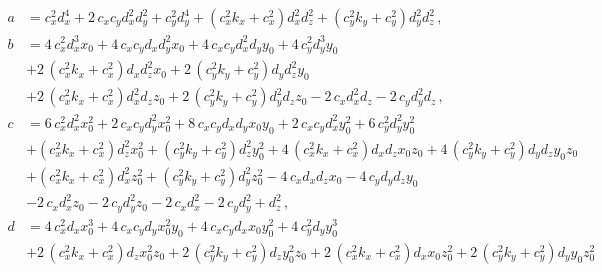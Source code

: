 \documentclass[12pt,a4paper,twoside,openright,BCOR10mm,headsepline,titlepage,abstracton,chapterprefix,final]{scrreprt}
\begin{document}
\begin{subequations}
 \begin{align}
  a &= c_{x}^{2} d_{x}^{4} + 2 \, c_{x} c_{y} d_{x}^{2} d_{y}^{2} + c_{y}^{2} d_{y}^{4} 
	+ {\left(c_{x}^{2} k_{x} + c_{x}^{2}\right)} d_{x}^{2} d_{z}^{2} + {\left(c_{y}^{2} k_{y} + c_{y}^{2}\right)} d_{y}^{2} d_{z}^{2}\,,\\
  b &= 4 \, c_{x}^{2} d_{x}^{3} x_{0} + 4 \, c_{x} c_{y} d_{x} d_{y}^{2} x_{0} 
	+ 4 \, c_{x} c_{y} d_{x}^{2} d_{y} y_{0} + 4 \, c_{y}^{2} d_{y}^{3} y_{0} \nonumber\\&
	+ 2 \, {\left(c_{x}^{2} k_{x} + c_{x}^{2}\right)} d_{x} d_{z}^{2} x_{0} 
	+ 2 \, {\left(c_{y}^{2} k_{y} + c_{y}^{2}\right)} d_{y} d_{z}^{2} y_{0} \nonumber\\& 
	+ 2 \, {\left(c_{x}^{2} k_{x} + c_{x}^{2}\right)} d_{x}^{2} d_{z} z_{0} 
	+ 2 \, {\left(c_{y}^{2} k_{y} + c_{y}^{2}\right)} d_{y}^{2} d_{z} z_{0} 
	- 2 \, c_{x} d_{x}^{2} d_{z} - 2 \, c_{y} d_{y}^{2} d_{z}\,,\\
  c &= 6 \, c_{x}^{2} d_{x}^{2} x_{0}^{2} + 2 \, c_{x} c_{y} d_{y}^{2} x_{0}^{2} + 8 \, c_{x} c_{y} d_{x} d_{y} x_{0} y_{0} 
      + 2 \, c_{x} c_{y} d_{x}^{2} y_{0}^{2} + 6 \, c_{y}^{2} d_{y}^{2} y_{0}^{2} \nonumber\\&
      + {\left(c_{x}^{2} k_{x} + c_{x}^{2}\right)} d_{z}^{2} x_{0}^{2} 
      + {\left(c_{y}^{2} k_{y} + c_{y}^{2}\right)} d_{z}^{2} y_{0}^{2} 
      + 4 \, {\left(c_{x}^{2} k_{x} + c_{x}^{2}\right)} d_{x} d_{z} x_{0} z_{0} 
      + 4 \, {\left(c_{y}^{2} k_{y} + c_{y}^{2}\right)} d_{y} d_{z} y_{0} z_{0}\nonumber\\& 
      + {\left(c_{x}^{2} k_{x} + c_{x}^{2}\right)} d_{x}^{2} z_{0}^{2} 
      + {\left(c_{y}^{2} k_{y} + c_{y}^{2}\right)} d_{y}^{2} z_{0}^{2} 
      - 4 \, c_{x} d_{x} d_{z} x_{0} - 4 \, c_{y} d_{y} d_{z} y_{0} \nonumber\\&
      - 2 \, c_{x} d_{x}^{2} z_{0} - 2 \, c_{y} d_{y}^{2} z_{0} 
      - 2 \, c_{x} d_{x}^{2} - 2 \, c_{y} d_{y}^{2} + d_{z}^{2}\,,\\
  d &= 4 \, c_{x}^{2} d_{x} x_{0}^{3} + 4 \, c_{x} c_{y} d_{y} x_{0}^{2} y_{0} 
       + 4 \, c_{x} c_{y} d_{x} x_{0} y_{0}^{2} + 4 \, c_{y}^{2} d_{y} y_{0}^{3} \nonumber\\& 
       + 2 \, {\left(c_{x}^{2} k_{x} + c_{x}^{2}\right)} d_{z} x_{0}^{2} z_{0} 
       + 2 \, {\left(c_{y}^{2} k_{y} + c_{y}^{2}\right)} d_{z} y_{0}^{2} z_{0} 
       + 2 \, {\left(c_{x}^{2} k_{x} + c_{x}^{2}\right)} d_{x} x_{0} z_{0}^{2} 
       + 2 \, {\left(c_{y}^{2} k_{y} + c_{y}^{2}\right)} d_{y} y_{0} z_{0}^{2} \nonumber\\&

\end{align}
\end{subequations}
\end{document}
